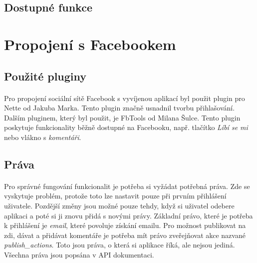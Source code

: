 \documentclass[11pt,a4paper,titlepage,oneside]{book}
\begin{document}
					\paragraph{} 
			\subsection{Dostupné funkce}


				\paragraph{}

		\section{Propojení s Facebookem}
			\subsection{Použité pluginy}


				\paragraph{} Pro propojení sociální sítě Facebook s vyvíjenou aplikací byl použit plugin pro Nette\cite{nette20login} od Jakuba Marka. Tento plugin značně usnadnil tvorbu přihlašování. Dalším pluginem, který byl použit, je FbTools\cite{FbTools} od Milana Šulce. Tento plugin poskytuje funkcionality běžně dostupné na Facebooku, např. tlačítko \textit{Líbí se mi} nebo vlákno s \textit{komentáři}.
			\subsection{Práva}
				\paragraph{} Pro správné fungování funkcionalit je potřeba si vyžádat potřebná  práva. Zde se vyskytuje problém, protože toto lze nastavit pouze při prvním přihlá\-šení uživatele. Pozdější změny jsou možné pouze tehdy, když si uživatel odebere aplikaci a poté si ji znovu přidá s novými právy. Základní právo, které je potřeba k přihlášení je \textit{email}, které povoluje získání emailu. Pro možnost publikovat na zdi, dávat  a přidávat komentáře je potřeba mít právo zveřejňovat akce nazvané \textit{publish\_actions}. Toto jsou práva, o která si aplikace říká, ale nejsou jediná. Všechna práva jsou popsána v API dokumentaci\cite{FbApiPrava}.
\end{document}
